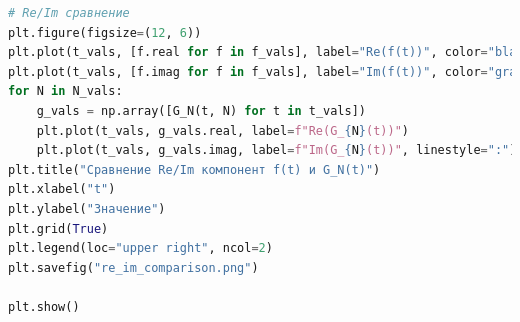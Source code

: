 \begin{lstlisting}[language=Python, caption=Визуализация параметрической функции и её аппроксимаций]
# Re/Im сравнение
plt.figure(figsize=(12, 6))
plt.plot(t_vals, [f.real for f in f_vals], label="Re(f(t))", color="black", linestyle="--")
plt.plot(t_vals, [f.imag for f in f_vals], label="Im(f(t))", color="gray", linestyle="--")
for N in N_vals:
    g_vals = np.array([G_N(t, N) for t in t_vals])
    plt.plot(t_vals, g_vals.real, label=f"Re(G_{N}(t))")
    plt.plot(t_vals, g_vals.imag, label=f"Im(G_{N}(t))", linestyle=":")
plt.title("Сравнение Re/Im компонент f(t) и G_N(t)")
plt.xlabel("t")
plt.ylabel("Значение")
plt.grid(True)
plt.legend(loc="upper right", ncol=2)
plt.savefig("re_im_comparison.png")

plt.show()

\end{lstlisting}
